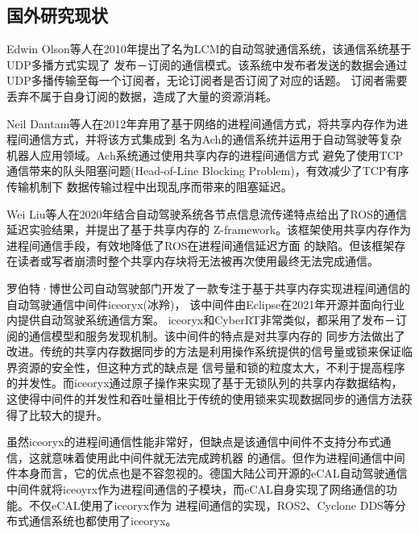 \subsection{国外研究现状}
Edwin Olson等人在2010年提出了名为LCM\cite{2010LCM}的自动驾驶通信系统，该通信系统基于UDP多播方式实现了
发布－订阅的通信模式。该系统中发布者发送的数据会通过UDP多播传输至每一个订阅者，无论订阅者是否订阅了对应的话题。
订阅者需要丢弃不属于自身订阅的数据，造成了大量的资源消耗。

Neil Dantam等人在2012年弃用了基于网络的进程间通信方式，将共享内存作为进程间通信方式，并将该方式集成到
名为Ach\cite{6651538}的通信系统并运用于自动驾驶等复杂机器人应用领域。Ach系统通过使用共享内存的进程间通信方式
避免了使用TCP通信带来的队头阻塞问题(Head-of-Line Blocking Problem)，有效减少了TCP有序传输机制下
数据传输过程中出现乱序而带来的阻塞延迟\cite{8863328}。

Wei Liu等人在2020年结合自动驾驶系统各节点信息流传递特点给出了ROS的通信延迟实验结果，并提出了基于共享内存的
Z-framework\cite{2020memory}。该框架使用共享内存作为进程间通信手段，有效地降低了ROS在进程间通信延迟方面
的缺陷。但该框架存在读者或写者崩溃时整个共享内存块将无法被再次使用最终无法完成通信。


罗伯特·博世公司自动驾驶部门开发了一款专注于基于共享内存实现进程间通信的自动驾驶通信中间件iceoryx(冰羚)，
该中间件由Eclipse在2021年开源并面向行业内提供自动驾驶系统通信方案。
iceoryx和CyberRT非常类似，都采用了发布－订阅的通信模型和服务发现机制。该中间件的特点是对共享内存的
同步方法做出了改进。传统的共享内存数据同步的方法是利用操作系统提供的信号量或锁来保证临界资源的安全性，但这种方式的缺点是
信号量和锁的粒度太大，不利于提高程序的并发性。而iceoryx通过原子操作来实现了基于无锁队列的共享内存数据结构，
这使得中间件的并发性和吞吐量相比于传统的使用锁来实现数据同步的通信方法获得了比较大的提升\cite{iceoryx}。

虽然iceoryx的进程间通信性能非常好，但缺点是该通信中间件不支持分布式通信，这就意味着使用此中间件就无法完成跨机器
的通信。但作为进程间通信中间件本身而言，它的优点也是不容忽视的。德国大陆公司开源的eCAL自动驾驶通信
中间件就将iceoyrx作为进程间通信的子模块，而eCAL自身实现了网络通信的功能。不仅eCAL使用了iceoryx作为
进程间通信的实现，ROS2、Cyclone DDS等分布式通信系统也都使用了iceoryx\cite{ecal}。


